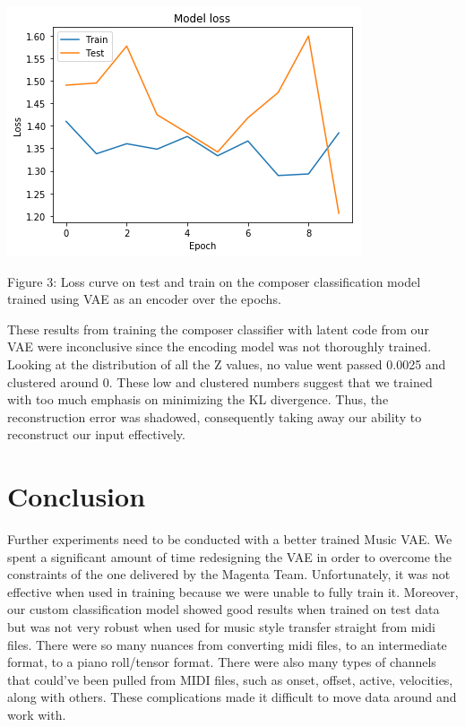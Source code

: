 \documentclass{article}
\begin{document}
\centerline{\includegraphics[width=\columnwidth]{badloss}}

Figure 3: Loss curve on test and train on the composer classification model trained using VAE as an encoder over the epochs. 

These results from training the composer classifier with latent code from our VAE were inconclusive since the encoding model was not thoroughly trained. Looking at the distribution of all the Z values, no value went passed 0.0025 and clustered around 0. These low and clustered numbers suggest that we trained with too much emphasis on minimizing the KL divergence. Thus, the reconstruction error was shadowed, consequently taking away our ability to reconstruct our input effectively. 

\section{Conclusion}
\label{conclusion}

Further experiments need to be conducted with a better trained Music VAE. We spent a significant amount of time redesigning the VAE in order to overcome the constraints of the one delivered by the Magenta Team. Unfortunately, it was not effective when used in training because we were unable to fully train it. Moreover, our custom classification model showed good results when trained on test data but was not very robust when used for music style transfer straight from midi files. There were so many nuances from converting midi files, to an intermediate format, to a piano roll/tensor format. There were also many types of channels that could've been pulled from MIDI files, such as onset, offset, active, velocities, along with others. These complications made it difficult to move data around and work with.
\end{document}
